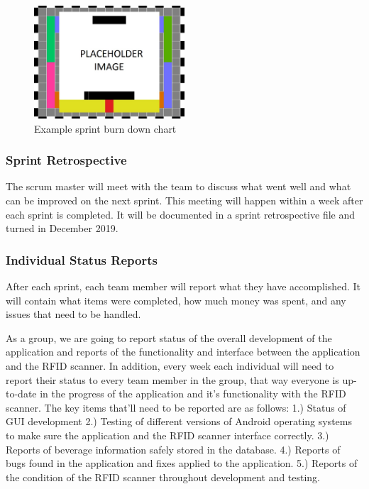\begin{figure}[h!]
    \centering
    \includegraphics[width=0.5\textwidth]{images/test_image}
    \caption{Example sprint burn down chart}
\end{figure}

\subsubsection{Sprint Retrospective}
The scrum master will meet with the team to discuss what went well and what can be improved on the next sprint. This meeting will happen within a week after each sprint is completed. It will be documented in a sprint retrospective file and turned in December 2019.

\subsubsection{Individual Status Reports}
After each sprint, each team member will report what they have accomplished. It will contain what items were completed, how much money was spent, and any issues that need to be handled.

As a group, we are going to report status of the overall development of the application and reports of the functionality and interface between the application and the RFID scanner.  In addition, every week each individual will need to report their status to every team member in the group, that way everyone is up-to-date in the progress of the application and it's functionality with the RFID scanner.  The key items that'll need to be reported are as follows:
1.) Status of GUI development
2.) Testing of different versions of Android operating systems to make sure the application and the RFID scanner interface correctly.
3.) Reports of beverage information safely stored in the database.
4.) Reports of bugs found in the application and fixes applied to the application.
5.) Reports of the condition of the RFID scanner throughout development and testing.

